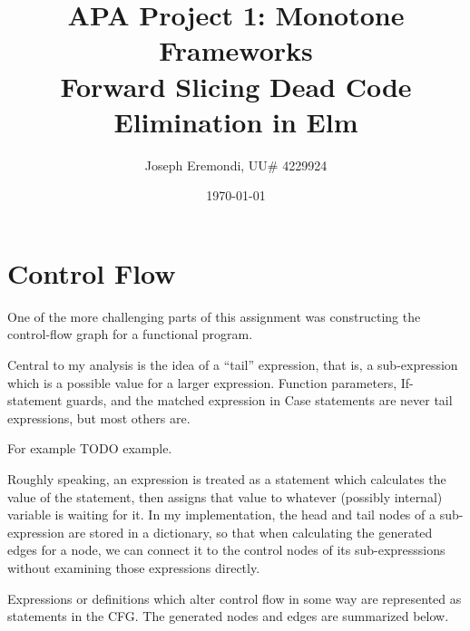 \documentclass{article}
\title{APA Project 1: Monotone Frameworks\\
Forward Slicing Dead Code Elimination in Elm}
\author{Joseph Eremondi, UU\# 4229924}
\date{\today}
\begin{document}
\maketitle

\section{Control Flow}

One of the more challenging parts of this assignment was constructing the control-flow graph for a functional program.

Central to my analysis is the idea of a ``tail'' expression, that is, a sub-expression which is a possible value for a larger expression. Function parameters, If-statement guards, and the matched expression in Case statements are never tail expressions, but most others are.

For example TODO example.

Roughly speaking, an expression is treated as a statement which calculates the value of the statement, then assigns that value to whatever (possibly internal) variable is waiting for it. In my implementation, the head and tail nodes of a sub-expression are stored in a dictionary, so that when calculating the generated edges for a node, we can connect it to the control nodes of its sub-expresssions without examining those expressions directly.

Expressions or definitions which alter control flow in some way are represented as statements in the CFG. The generated nodes and edges are summarized below.
\end{document}
